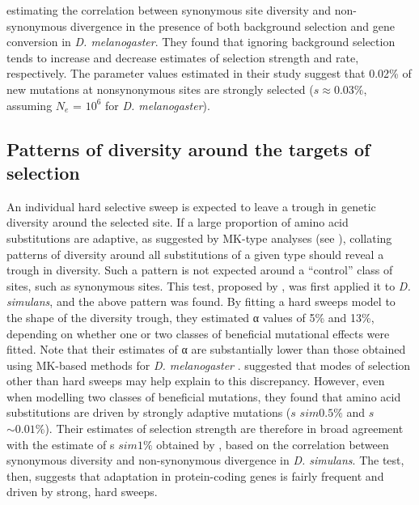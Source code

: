 estimating the correlation between synonymous site diversity and non-synonymous divergence in the presence of both background selection and gene conversion in \textit{D. melanogaster}. They found that ignoring background selection tends to increase and decrease estimates of selection strength and rate, respectively. The parameter values estimated in their study suggest that 0.02\% of new mutations at nonsynonymous sites are strongly selected ($s \approx 0.03\%$, assuming $N_e$ = $10^6$ for \textit{D. melanogaster}).
 
\subsection[Patterns of diversity around the targets of selection]{Patterns of diversity around the targets of selection}
 
An individual hard selective sweep is expected to leave a trough in genetic diversity around the selected site. If a large proportion of amino acid substitutions are adaptive, as suggested by MK-type analyses (see \citealt{RN215}), collating patterns of diversity around all substitutions of a given type should reveal a trough in diversity. Such a pattern is not expected around a “control” class of sites, such as synonymous sites. This test, proposed by \cite{RN167}, was first applied it to \textit{D. simulans}, and the above pattern was found. By fitting a hard sweeps model to the shape of the diversity trough, they estimated α values of  5\% and 13\%, depending on whether one or two classes of beneficial mutational effects were fitted. Note that their estimates of α are substantially lower than those obtained using MK-based methods for \textit{D. melanogaster} \citealt{RN283}. \cite{RN167} suggested that modes of selection other than hard sweeps may help explain to this discrepancy. However, even when modelling two classes of beneficial mutations, they found that amino acid substitutions are driven by strongly adaptive mutations ($s$ $sim0.5\%$ and $s$ $\sim0.01\%$). Their estimates of selection strength are therefore in broad agreement with the estimate of s $sim1\%$ obtained by \cite{RN289}, based on the correlation between synonymous diversity and non-synonymous divergence in \textit{D. simulans}. The \cite{RN167} test, then, suggests that adaptation in protein-coding genes is fairly frequent and driven by strong, hard sweeps.
 
